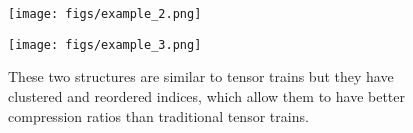 \begin{figure}[h]
    \centering
    \begin{minipage}{0.33\linewidth}
        \texttt{[image: figs/example\_2.png]}
    \end{minipage}
    \begin{minipage}{0.33\linewidth}
        \texttt{[image: figs/example\_3.png]}
    \end{minipage}
    \caption{These two structures are similar to tensor trains but they have clustered and reordered indices, which allow them to have better compression ratios than traditional tensor trains.}
    \label{fig:appendix:reorder}
\end{figure}